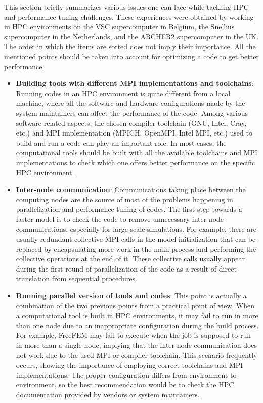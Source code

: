 This section briefly summarizes various issues one can face while tackling \gls{HPC} and performance-tuning challenges. These experiences were obtained by working in \gls{HPC} environments on the VSC supercomputer in Belgium, the Snellius supercomputer in the Netherlands, and the ARCHER2 supercomputer in the UK. The order in which the items are sorted does not imply their importance. All the mentioned points should be taken into account for optimizing a code to get better performance.

\begin{itemize}
\item
\textbf{Building tools with different \gls{MPI} implementations and toolchains}: Running codes in an \gls{HPC} environment is quite different from a local machine, where all the software and hardware configurations made by the system maintainers can affect the performance of the code. Among various software-related aspects, the chosen compiler toolchain (GNU, Intel, Cray, etc.) and \gls{MPI} implementation (MPICH, OpenMPI, Intel \gls{MPI}, etc.) used to build and run a code can play an important role. In most cases, the computational tools should be built with all the available toolchains and \gls{MPI} implementations to check which one offers better performance on the specific \gls{HPC} environment.
\item
\textbf{Inter-node communication}: Communications taking place between the computing nodes are the source of most of the problems happening in parallelization and performance tuning of codes. The first step towards a faster model is to check the code to remove unnecessary inter-node communications, especially for large-scale simulations. For example, there are usually redundant collective \gls{MPI} calls in the model initialization that can be replaced by encapsulating more work in the main process and performing the collective operations at the end of it. These collective calls usually appear during the first round of parallelization of the code as a result of direct translation from sequential procedures.
\item
\textbf{Running parallel version of tools and codes}: This point is actually a combination of the two previous points from a practical point of view. When a computational tool is built in \gls{HPC} environments, it may fail to run in more than one node due to an inappropriate configuration during the build process. For example, FreeFEM may fail to execute when the job is supposed to run in more than a single node, implying that the inter-node communication does not work due to the used \gls{MPI} or compiler toolchain. This scenario frequently occurs, showing the importance of employing correct toolchains and \gls{MPI} implementations. The proper configuration differs from environment to environment, so the best recommendation would be to check the \gls{HPC} documentation provided by vendors or system maintainers.

\end{itemize}
